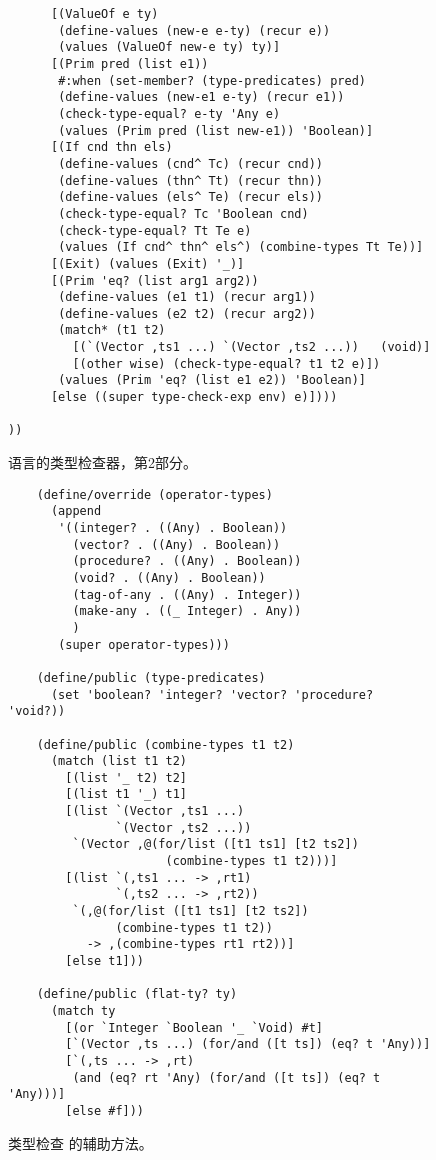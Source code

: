 \documentclass[11pt]{book}
\begin{document}
\begin{figure}[btp]
 \begin{lstlisting}
      [(ValueOf e ty)
       (define-values (new-e e-ty) (recur e))
       (values (ValueOf new-e ty) ty)]
      [(Prim pred (list e1))
       #:when (set-member? (type-predicates) pred)
       (define-values (new-e1 e-ty) (recur e1))
       (check-type-equal? e-ty 'Any e)
       (values (Prim pred (list new-e1)) 'Boolean)]
      [(If cnd thn els)
       (define-values (cnd^ Tc) (recur cnd))
       (define-values (thn^ Tt) (recur thn))
       (define-values (els^ Te) (recur els))
       (check-type-equal? Tc 'Boolean cnd)
       (check-type-equal? Tt Te e)
       (values (If cnd^ thn^ els^) (combine-types Tt Te))]
      [(Exit) (values (Exit) '_)]
      [(Prim 'eq? (list arg1 arg2))
       (define-values (e1 t1) (recur arg1))
       (define-values (e2 t2) (recur arg2))
       (match* (t1 t2)
         [(`(Vector ,ts1 ...) `(Vector ,ts2 ...))   (void)]
         [(other wise) (check-type-equal? t1 t2 e)])
       (values (Prim 'eq? (list e1 e2)) 'Boolean)]
      [else ((super type-check-exp env) e)])))

))
\end{lstlisting}
\caption{ \LangAny{} 语言的类型检查器，第2部分。}
\label{fig:type-check-Rany-part-2}
\end{figure}


\begin{figure}[tbp]
\begin{lstlisting}
    (define/override (operator-types)
      (append
       '((integer? . ((Any) . Boolean))
         (vector? . ((Any) . Boolean))
         (procedure? . ((Any) . Boolean))
         (void? . ((Any) . Boolean))
         (tag-of-any . ((Any) . Integer))
         (make-any . ((_ Integer) . Any))
         )
       (super operator-types)))

    (define/public (type-predicates)
      (set 'boolean? 'integer? 'vector? 'procedure? 'void?))

    (define/public (combine-types t1 t2)
      (match (list t1 t2)
        [(list '_ t2) t2]
        [(list t1 '_) t1]
        [(list `(Vector ,ts1 ...)
               `(Vector ,ts2 ...))
         `(Vector ,@(for/list ([t1 ts1] [t2 ts2])
                      (combine-types t1 t2)))]
        [(list `(,ts1 ... -> ,rt1)
               `(,ts2 ... -> ,rt2))
         `(,@(for/list ([t1 ts1] [t2 ts2])
               (combine-types t1 t2))
           -> ,(combine-types rt1 rt2))]
        [else t1]))

    (define/public (flat-ty? ty)
      (match ty
        [(or `Integer `Boolean '_ `Void) #t]
        [`(Vector ,ts ...) (for/and ([t ts]) (eq? t 'Any))]
        [`(,ts ... -> ,rt)
         (and (eq? rt 'Any) (for/and ([t ts]) (eq? t 'Any)))]
        [else #f]))
\end{lstlisting}
\caption{类型检查 \LangAny{} 的辅助方法。}
\label{fig:type-check-Rany-aux}
\end{figure}
\end{document}
